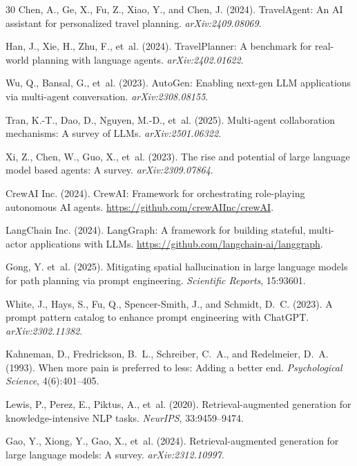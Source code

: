 \documentclass[11pt]{article}
\begin{document}
\begin{thebibliography}{30}
Chen, A., Ge, X., Fu, Z., Xiao, Y., and Chen, J. (2024).
\newblock TravelAgent: An AI assistant for personalized travel planning.
\newblock \emph{arXiv:2409.08069}.

Han, J., Xie, H., Zhu, F., et~al. (2024).
\newblock TravelPlanner: A benchmark for real-world planning with language agents.
\newblock \emph{arXiv:2402.01622}.

Wu, Q., Bansal, G., et~al. (2023).
\newblock AutoGen: Enabling next-gen LLM applications via multi-agent conversation.
\newblock \emph{arXiv:2308.08155}.

Tran, K.-T., Dao, D., Nguyen, M.-D., et~al. (2025).
\newblock Multi-agent collaboration mechanisms: A survey of LLMs.
\newblock \emph{arXiv:2501.06322}.

Xi, Z., Chen, W., Guo, X., et~al. (2023).
\newblock The rise and potential of large language model based agents: A survey.
\newblock \emph{arXiv:2309.07864}.

CrewAI Inc. (2024).
\newblock CrewAI: Framework for orchestrating role-playing autonomous AI agents.
\newblock \url{https://github.com/crewAIInc/crewAI}.

LangChain Inc. (2024).
\newblock LangGraph: A framework for building stateful, multi-actor applications with LLMs.
\newblock \url{https://github.com/langchain-ai/langgraph}.

Gong, Y. et~al. (2025).
\newblock Mitigating spatial hallucination in large language models for path planning via prompt engineering.
\newblock \emph{Scientific Reports}, 15:93601.

White, J., Hays, S., Fu, Q., Spencer-Smith, J., and Schmidt, D.~C. (2023).
\newblock A prompt pattern catalog to enhance prompt engineering with ChatGPT.
\newblock \emph{arXiv:2302.11382}.

Kahneman, D., Fredrickson, B.~L., Schreiber, C.~A., and Redelmeier, D.~A. (1993).
\newblock When more pain is preferred to less: Adding a better end.
\newblock \emph{Psychological Science}, 4(6):401--405.

Lewis, P., Perez, E., Piktus, A., et~al. (2020).
\newblock Retrieval-augmented generation for knowledge-intensive NLP tasks.
\newblock \emph{NeurIPS}, 33:9459--9474.

Gao, Y., Xiong, Y., Gao, X., et~al. (2024).
\newblock Retrieval-augmented generation for large language models: A survey.
\newblock \emph{arXiv:2312.10997}.


\end{thebibliography}
\end{document}
